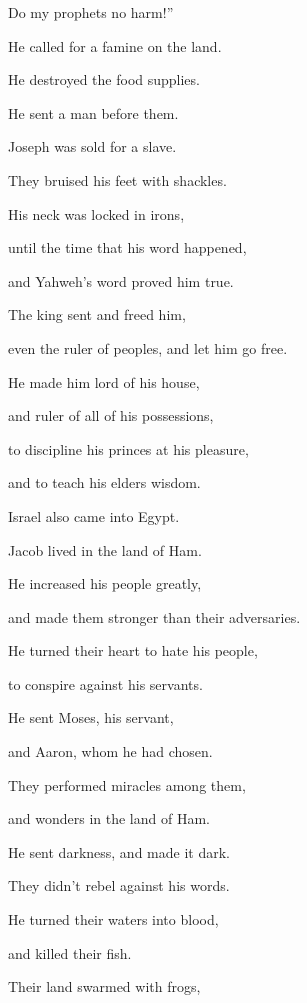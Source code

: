 {\par }{\QB Do my prophets no harm!”
\par }{\Q {}He called for a famine on the land.
\par }{\QB He destroyed the food supplies.
\par }{\Q {}He sent a man before them.
\par }{\QB Joseph was sold for a slave.
\par }{\Q {}They bruised his feet with shackles.
\par }{\QB His neck was locked in irons,
\par }{\Q {}until the time that his word happened,
\par }{\QB and Yahweh’s word proved him true.
\par }{\Q {}The king sent and freed him,
\par }{\QB even the ruler of peoples, and let him go free.
\par }{\Q {}He made him lord of his house,
\par }{\QB and ruler of all of his possessions,
\par }{\Q {}to discipline his princes at his pleasure,
\par }{\QB and to teach his elders wisdom.
\par }{\Q {}Israel also came into Egypt.
\par }{\QB Jacob lived in the land of Ham.
\par }{\Q {}He increased his people greatly,
\par }{\QB and made them stronger than their adversaries.
\par }{\Q {}He turned their heart to hate his people,
\par }{\QB to conspire against his servants.
\par }{\Q {}He sent Moses, his servant,
\par }{\QB and Aaron, whom he had chosen.
\par }{\Q {}They performed miracles among them,
\par }{\QB and wonders in the land of Ham.
\par }{\Q {}He sent darkness, and made it dark.
\par }{\QB They didn’t rebel against his words.
\par }{\Q {}He turned their waters into blood,
\par }{\QB and killed their fish.
\par }{\Q {}Their land swarmed with frogs,
}
